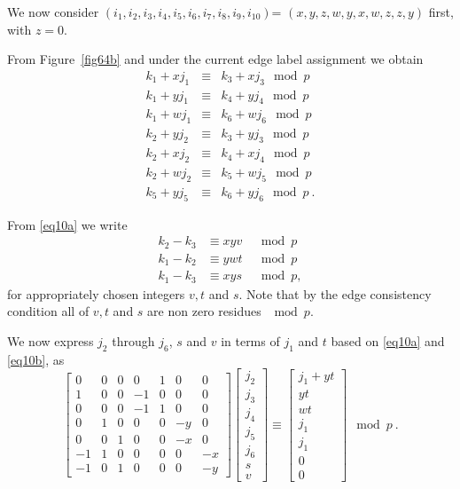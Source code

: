 {We now consider $(i_1,i_2,i_3,i_4,i_5,i_6,i_7,i_8,i_9,i_{10})$=
$(x,y,z,w,y,x,w,z,z,y)$ first, with $z=0$. 

 From Figure~\ref{fig64b} and under the current edge label
 assignment we obtain
\begin{equation}\label{eq10a}\begin{array}{ccccc}
k_1+xj_1 & \equiv & k_3+xj_3 \mod p\\
k_1+yj_1 & \equiv & k_4+yj_4 \mod p\\
k_1+wj_1 & \equiv & k_6+wj_6 \mod p\\
k_2+yj_2 & \equiv & k_3+yj_3 \mod p\\
k_2+xj_2 & \equiv & k_4+xj_4 \mod p\\
k_2+wj_2 & \equiv & k_5+wj_5 \mod p\\
k_5+yj_5 & \equiv & k_6+yj_6 \mod p~.
\end{array}\end{equation}

From \eqref{eq10a} we write
\begin{equation}\label{eq10b}\begin{array}{cccc}
k_2-k_3 &\equiv xyv &\mod p \\
k_1-k_2 &\equiv ywt &\mod p\\
k_1-k_3 &\equiv xys &\mod p,
\end{array}\end{equation}
for appropriately chosen integers $v,t$ and $s$. Note that by the
edge consistency condition all of $v,t$ and $s$ are non zero
residues $\mod p$.


We now express $j_2$ through $j_6$, $s$ and $v$ in terms of $j_1$
and $t$ based on \eqref{eq10a} and \eqref{eq10b}, as
\begin{equation}\label{eq10c}
\left[ \begin{array}{ccccccc} 0 & 0 & 0 & 0 & 1 & 0 &0\\
1 & 0 & 0 & -1 & 0 & 0 &0\\
0 & 0 & 0 & -1 & 1 & 0 &0\\
0 & 1 & 0 & 0 & 0 & -y &0\\
0 & 0 & 1 & 0 & 0 & -x &0\\
-1 & 1 & 0 & 0 & 0 & 0 &-x\\
-1 & 0 & 1 & 0 & 0 & 0 &-y
\end{array}\right] \left[\begin{array}{c}
j_2\\j_3\\j_4\\j_5\\j_6\\s\\v\end{array}\right] \equiv
\left[\begin{array}{c}j_1+yt\\yt\\wt\\j_1\\j_1\\0\\0\end{array}\right]
\mod p~.
\end{equation}

}
